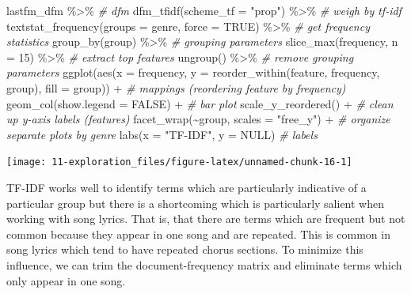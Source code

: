 \documentclass[
]{article}
\newenvironment{Shaded}{\begin{snugshade}}{\end{snugshade}}
\newcommand{\AttributeTok}[1]{\textcolor[rgb]{0.77,0.63,0.00}{#1}}
\newcommand{\CommentTok}[1]{\textcolor[rgb]{0.56,0.35,0.01}{\textit{#1}}}
\newcommand{\ConstantTok}[1]{\textcolor[rgb]{0.00,0.00,0.00}{#1}}
\newcommand{\DecValTok}[1]{\textcolor[rgb]{0.00,0.00,0.81}{#1}}
\newcommand{\FunctionTok}[1]{\textcolor[rgb]{0.00,0.00,0.00}{#1}}
\newcommand{\NormalTok}[1]{#1}
\newcommand{\SpecialCharTok}[1]{\textcolor[rgb]{0.00,0.00,0.00}{#1}}
\newcommand{\StringTok}[1]{\textcolor[rgb]{0.31,0.60,0.02}{#1}}
\begin{document}
\begin{Shaded}
\begin{Highlighting}[]
\NormalTok{lastfm\_dfm }\SpecialCharTok{\%\textgreater{}\%} \CommentTok{\# dfm}
  \FunctionTok{dfm\_tfidf}\NormalTok{(}\AttributeTok{scheme\_tf =} \StringTok{"prop"}\NormalTok{) }\SpecialCharTok{\%\textgreater{}\%}  \CommentTok{\# weigh by tf{-}idf}
  \FunctionTok{textstat\_frequency}\NormalTok{(}\AttributeTok{groups =}\NormalTok{ genre, }\AttributeTok{force =} \ConstantTok{TRUE}\NormalTok{) }\SpecialCharTok{\%\textgreater{}\%} \CommentTok{\# get frequency statistics}
  \FunctionTok{group\_by}\NormalTok{(group) }\SpecialCharTok{\%\textgreater{}\%} \CommentTok{\# grouping parameters}
  \FunctionTok{slice\_max}\NormalTok{(frequency, }\AttributeTok{n =} \DecValTok{15}\NormalTok{) }\SpecialCharTok{\%\textgreater{}\%} \CommentTok{\# extract top features}
  \FunctionTok{ungroup}\NormalTok{() }\SpecialCharTok{\%\textgreater{}\%} \CommentTok{\# remove grouping parameters}
  \FunctionTok{ggplot}\NormalTok{(}\FunctionTok{aes}\NormalTok{(}\AttributeTok{x =}\NormalTok{ frequency, }\AttributeTok{y =} \FunctionTok{reorder\_within}\NormalTok{(feature, frequency, group), }\AttributeTok{fill =}\NormalTok{ group)) }\SpecialCharTok{+} \CommentTok{\# mappings (reordering feature by frequency)}
  \FunctionTok{geom\_col}\NormalTok{(}\AttributeTok{show.legend =} \ConstantTok{FALSE}\NormalTok{) }\SpecialCharTok{+} \CommentTok{\# bar plot}
  \FunctionTok{scale\_y\_reordered}\NormalTok{() }\SpecialCharTok{+} \CommentTok{\# clean up y{-}axis labels (features)}
  \FunctionTok{facet\_wrap}\NormalTok{(}\SpecialCharTok{\textasciitilde{}}\NormalTok{group, }\AttributeTok{scales =} \StringTok{"free\_y"}\NormalTok{) }\SpecialCharTok{+} \CommentTok{\# organize separate plots by genre}
  \FunctionTok{labs}\NormalTok{(}\AttributeTok{x =} \StringTok{"TF{-}IDF"}\NormalTok{, }\AttributeTok{y =} \ConstantTok{NULL}\NormalTok{) }\CommentTok{\# labels}
\end{Highlighting}
\end{Shaded}

\begin{center}\texttt{[image: 11-exploration\_files/figure-latex/unnamed-chunk-16-1]} \end{center}

TF-IDF works well to identify terms which are particularly indicative of a particular group but there is a shortcoming which is particularly salient when working with song lyrics. That is, that there are terms which are frequent but not common because they appear in one song and are repeated. This is common in song lyrics which tend to have repeated chorus sections. To minimize this influence, we can trim the document-frequency matrix and eliminate terms which only appear in one song.
\end{document}
